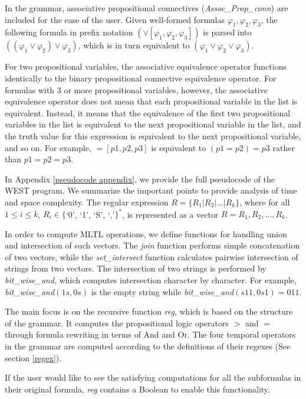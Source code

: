 \documentclass[runningheads]{llncs}
\renewcommand{\phi}{\varphi}
\begin{document}
In the grammar, associative propositional connectives (\textit{Assoc\_Prop\_conn}) are included for the ease of the user. Given well-formed formulas $\phi_1, \phi_2, \phi_3$, the following formula in prefix notation $(\lor[\phi_1, \phi_2, \phi_3])$ is parsed into $((\phi_1 \lor \phi_2) \lor \phi_3)$, which is in turn equivalent to $(\phi_1 \lor \phi_2 \lor \phi_3)$. \\
\begin{remark}
For two propositional variables, the associative equivalence operator functions identically to the binary propositional connective equivalence operator. For formulas with 3 or more propositional variables, however, the associative equivalence operator does not mean that each propositional variable in the list is equivalent. Instead, it means that the equivalence of the first two propositional variables in the list is equivalent to the next propositional variable in the list, and the truth value for this expression is equivalent to the next propositional variable, and so on. For example, $=[p1,p2,p3]$ is equivalent to $(p1=p2)=p3$ rather than $p1=p2=p3$.
\end{remark}

In Appendix \ref{pseudocode appendix}, we provide the full pseudocode of the WEST program.
We summarize the important points to provide analysis of time and space complexity. The regular expression $R = \{R_1 | R_2 | ... | R_k\}$, where for all $1 \leq i \leq k$, $R_i \in \{$`0', `1', `S', `,'$\}^*$, is represented as a vector $R = {R_1, R_2, ..., R_k}$.

In order to compute MLTL operations, we define functions for handling union and intersection of such vectors. 
The \textit{join} function performs simple concatenation of two vectors, while the \textit{set\_intersect} function calculates pairwise intersection of strings from two vectors.
The intersection of two strings is performed by \textit{bit\_wise\_and}, which computes intersection character by character.
For example, \textit{bit\_wise\_and}$(1s, 0s)$ is the empty string while \textit{bit\_wise\_and}$(s11, 0s1) = 011$. 

The main focus is on the recursive function \textit{reg}, which is based on the structure of the grammar. It computes the propositional logic operators $>$ and  $=$ through formula rewriting in terms of And and Or. The four temporal operators in the grammar are computed according to the definitions of their regexes (See section \ref{regex}).

If the user would like to see the satisfying computations for all the subformulas in their original formula, \textit{reg} contains a Boolean to enable this functionality. 
\end{document}
